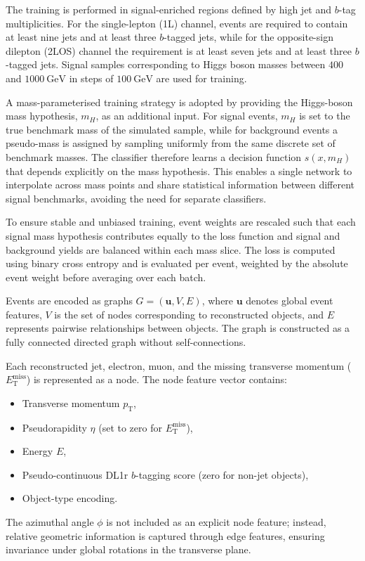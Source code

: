 The training is performed in signal-enriched regions defined by high jet and $b$-tag multiplicities. 
For the single-lepton (1L) channel, events are required to contain at least nine jets and at least three $b$-tagged jets, while for the opposite-sign dilepton (2LOS) channel the requirement is at least seven jets and at least three $b$-tagged jets. 
Signal samples corresponding to Higgs boson masses between $400$ and $1000~\mathrm{GeV}$ in steps of $100~\mathrm{GeV}$ are used for training.

A mass-parameterised training strategy is adopted by providing the Higgs-boson mass hypothesis, $m_H$, as an additional input. 
For signal events, $m_H$ is set to the true benchmark mass of the simulated sample, while for background events a pseudo-mass is assigned by sampling uniformly from the same discrete set of benchmark masses. 
The classifier therefore learns a decision function $s(x,m_H)$ that depends explicitly on the mass hypothesis. 
This enables a single network to interpolate across mass points and share statistical information between different signal benchmarks, avoiding the need for separate classifiers.

To ensure stable and unbiased training, event weights are rescaled such that each signal mass hypothesis contributes equally to the loss function and signal and background yields are balanced within each mass slice. 
The loss is computed using binary cross entropy and is evaluated per event, weighted by the absolute event weight before averaging over each batch.

Events are encoded as graphs $G=(\mathbf{u}, V, E)$, where $\mathbf{u}$ denotes global event features, $V$ is the set of nodes corresponding to reconstructed objects, and $E$ represents pairwise relationships between objects. 
The graph is constructed as a fully connected directed graph without self-connections.

Each reconstructed jet, electron, muon, and the missing transverse momentum ($E_{\mathrm{T}}^{\mathrm{miss}}$) is represented as a node. 
The node feature vector contains:
\begin{itemize}
    \item Transverse momentum $p_{\mathrm{T}}$,
    \item Pseudorapidity $\eta$ (set to zero for $E_{\mathrm{T}}^{\mathrm{miss}}$),
    \item Energy $E$,
    \item Pseudo-continuous DL1r $b$-tagging score (zero for non-jet objects),
    \item Object-type encoding.
\end{itemize}
The azimuthal angle $\phi$ is not included as an explicit node feature; instead, relative geometric information is captured through edge features, ensuring invariance under global rotations in the transverse plane.

